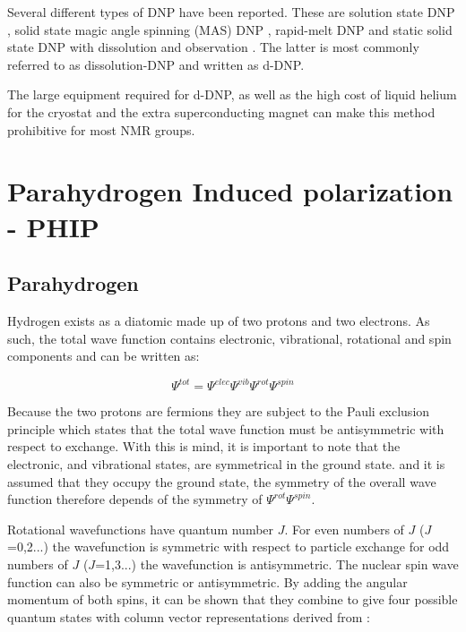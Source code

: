 Several different types of DNP have been reported. These are solution
state DNP \citep{RN158}, solid state magic angle spinning (MAS) DNP \citep{RN159}, rapid-melt DNP \citep{sharma2015rapid} and static solid state DNP with
dissolution and observation \citep{RN160}. The latter is most commonly referred to as dissolution-DNP and written as d-DNP.

The large equipment required for d-DNP, as well as the high cost of liquid helium for the cryostat and
the extra superconducting magnet can make this method prohibitive for most NMR groups.

 \section{Parahydrogen Induced polarization - PHIP}

 \subsection{Parahydrogen}

 Hydrogen exists as a diatomic made up of two protons and two electrons. As such, the total
 wave function contains electronic, vibrational, rotational and spin components and can be
 written as:

 \begin{equation}
  \Psi^{tot} =\Psi^{elec}\Psi^{vib}\Psi^{rot}\Psi^{spin}
 \end{equation}

 Because the two protons are fermions they are subject to the Pauli exclusion principle
 which states that the total wave function must be antisymmetric with respect to exchange. With
 this is mind, it is important to note that the electronic, and vibrational states, are symmetrical
 in the ground state.  and it is assumed that they occupy the ground state, the symmetry
 of the overall wave function therefore depends of the symmetry of $\Psi^{rot}$$\Psi^{spin}$.

 Rotational wavefunctions have quantum number $J$. For even numbers of $J$ ($J$=0,2...) the wavefunction
 is symmetric with respect to particle exchange for odd numbers of $J$ ($J$=1,3...) the wavefunction is
 antisymmetric. The nuclear spin wave function can also be symmetric or antisymmetric. By adding the
 angular momentum of both spins, it can be shown that they combine to give four possible quantum states
 with column vector representations derived from :


